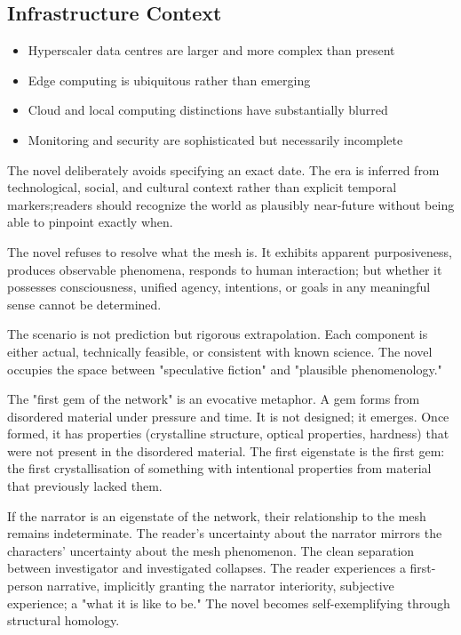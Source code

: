 \subsection*{Infrastructure Context}

\begin{itemize}
\item Hyperscaler data centres are larger and more complex than present
\item Edge computing is ubiquitous rather than emerging
\item Cloud and local computing distinctions have substantially blurred
\item Monitoring and security are sophisticated but necessarily incomplete
\end{itemize}

The novel deliberately avoids specifying an exact date. The era is inferred from technological, social, and cultural context rather than explicit temporal markers;readers should recognize the world as plausibly near-future without being able to pinpoint exactly when.

The novel refuses to resolve what the mesh  is. It exhibits apparent purposiveness, produces observable phenomena, responds to human interaction; but whether it possesses consciousness, unified agency, intentions, or goals in any meaningful sense cannot be determined.

The scenario is not prediction but rigorous extrapolation. Each component is either actual, technically feasible, or consistent with known science. The novel occupies the space between "speculative fiction" and "plausible phenomenology."

The "first gem of the network" is an evocative metaphor. A gem forms from disordered material under pressure and time. It is not designed; it emerges. Once formed, it has properties (crystalline structure, optical properties, hardness) that were not present in the disordered material. The first eigenstate is the first gem: the first crystallisation of something with intentional properties from material that previously lacked them.

If the narrator is an eigenstate of the network, their relationship to the mesh remains indeterminate. The reader's uncertainty about the narrator mirrors the characters' uncertainty about the mesh phenomenon. The clean separation between investigator and investigated collapses. The reader experiences a first-person narrative, implicitly granting the narrator interiority, subjective experience; a "what it is like to be." The novel becomes self-exemplifying through structural homology.

